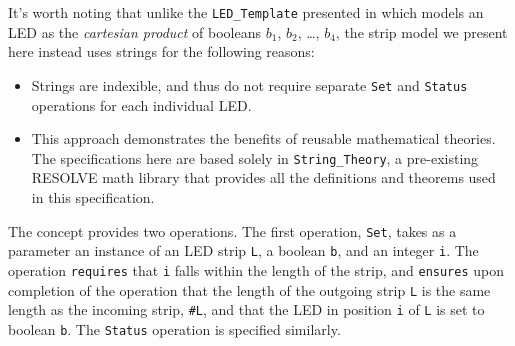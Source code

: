 \documentclass{sig-alternate}
\begin{document}
It's worth noting that unlike the \texttt{LED\_Template} presented in \cite{regula:2010} which models an LED as the \textit{cartesian product} of booleans $b_1$, $b_2$, \ldots , $b_4$, the strip model we present here instead uses strings for the following reasons:
\begin{itemize}
\item Strings are indexible, and thus do not require separate \texttt{Set} and \texttt{Status} operations for each individual LED.
\item This approach demonstrates the benefits of reusable mathematical theories. The specifications here are based solely in \texttt{String\_Theory}, a pre-existing RESOLVE math library that provides all the definitions and theorems used in this specification.
\end{itemize}

The concept provides two operations. The first operation, \texttt{Set}, takes as a parameter an instance of an LED strip \texttt{L}, a boolean \texttt{b}, and an integer \texttt{i}. The operation \texttt{requires} that \texttt{i} falls within the length of the strip, and \texttt{ensures} upon completion of the operation that the length of the outgoing strip \texttt{L} is the same length as the incoming strip, \texttt{\#L}, and that the LED in position \texttt{i} of \texttt{L} is set to boolean \texttt{b}. The \texttt{Status} operation is specified similarly. 


\end{document}
